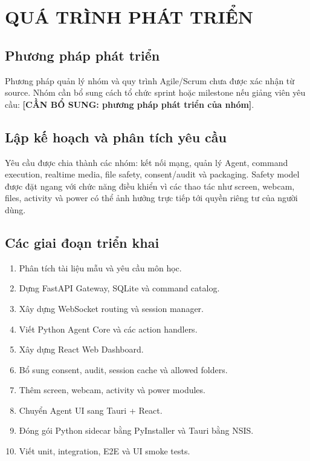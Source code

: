 \documentclass[12pt,a4paper]{article}
\newcommand{\placeholder}[1]{\textbf{[CẦN BỔ SUNG: #1]}}
\begin{document}
\section{QUÁ TRÌNH PHÁT TRIỂN}

\subsection{Phương pháp phát triển}

Phương pháp quản lý nhóm và quy trình Agile/Scrum chưa được xác nhận từ source. Nhóm cần bổ sung cách tổ chức sprint hoặc milestone nếu giảng viên yêu cầu: \placeholder{phương pháp phát triển của nhóm}.

\subsection{Lập kế hoạch và phân tích yêu cầu}

Yêu cầu được chia thành các nhóm: kết nối mạng, quản lý Agent, command execution, realtime media, file safety, consent/audit và packaging. Safety model được đặt ngang với chức năng điều khiển vì các thao tác như screen, webcam, files, activity và power có thể ảnh hưởng trực tiếp tới quyền riêng tư của người dùng.

\subsection{Các giai đoạn triển khai}

\begin{enumerate}[leftmargin=*]
    \item Phân tích tài liệu mẫu và yêu cầu môn học.
    \item Dựng FastAPI Gateway, SQLite và command catalog.
    \item Xây dựng WebSocket routing và session manager.
    \item Viết Python Agent Core và các action handlers.
    \item Xây dựng React Web Dashboard.
    \item Bổ sung consent, audit, session cache và allowed folders.
    \item Thêm screen, webcam, activity và power modules.
    \item Chuyển Agent UI sang Tauri + React.
    \item Đóng gói Python sidecar bằng PyInstaller và Tauri bằng NSIS.
    \item Viết unit, integration, E2E và UI smoke tests.
\end{enumerate}
\end{document}
